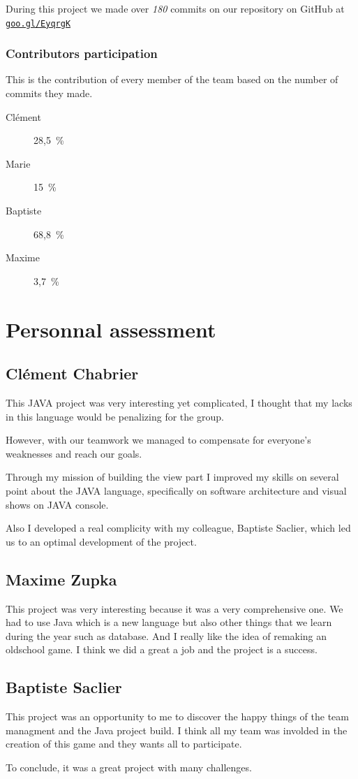 \documentclass{report}
\begin{document}
During this project we made over \emph{180} commits on our repository on GitHub at \texttt{\href{https://github.com/EpicKiwi/Lorann-Ex/}{goo.gl/EyqrgK}}

\subsection{Contributors participation}

This is the contribution of every member of the team based on the number of commits they made.

\begin{multicols}{4}
\begin{description}
\item [Clément] 28,5\ \%
\item [Marie] 15\ \%
\item [Baptiste] 68,8\ \%
\item [Maxime] 3,7\ \%
\end{description}
\end{multicols}

\chapter{Personnal assessment}

\section{Clément Chabrier}

This JAVA project was very interesting yet complicated, I thought that my lacks in this language would be penalizing for the group.

However, with our teamwork we managed to compensate for everyone’s weaknesses and reach our goals.

Through my mission of building the view part I improved my skills on several point about the JAVA language, specifically on software architecture and visual shows on JAVA console.

Also I developed a real complicity with my colleague, Baptiste Saclier, which led us to an optimal development of the project.

\section{Maxime Zupka}

This project was very interesting because it was a very comprehensive one. We had to use Java which is a new language but also other things that we learn during the year such as database. And I really like the idea of remaking an oldschool game. I think we did a great a job and the project is a success. 

\section{Baptiste Saclier}

This project was an opportunity to me to discover the happy things of the team managment and the Java project build. I think all my team was involded in the creation of this game and they wants all to participate.

To conclude, it was a great project with many challenges.
\end{document}
